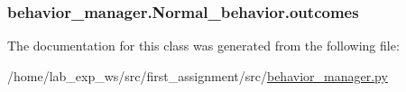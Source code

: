 \subsubsection[{\texorpdfstring{outcomes}{outcomes}}]{\setlength{\rightskip}{0pt plus 5cm}behavior\+\_\+manager.\+Normal\+\_\+behavior.\+outcomes\hspace{0.3cm}{\ttfamily [static]}}\hypertarget{classbehavior__manager_1_1Normal__behavior_a549e75cc34d356cff9b0915c99bf580a}{}\label{classbehavior__manager_1_1Normal__behavior_a549e75cc34d356cff9b0915c99bf580a}


The documentation for this class was generated from the following file\+:\begin{DoxyCompactItemize}
\item 
/home/lab\+\_\+exp\+\_\+ws/src/first\+\_\+assignment/src/\hyperlink{behavior__manager_8py}{behavior\+\_\+manager.\+py}\end{DoxyCompactItemize}
